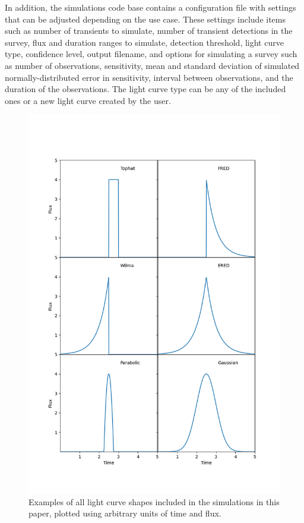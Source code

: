 \documentclass[12pt]{article}
\begin{document}
In addition, the simulations code base contains a configuration file with settings that can be adjusted depending on the use case. These settings include items such as number of transients to simulate, number of transient detections in the survey, flux and duration ranges to simulate, detection threshold, light curve type, confidence level, output filename, and options for simulating a survey such as number of observations, sensitivity, mean and standard deviation of simulated normally-distributed error in sensitivity, interval between observations, and the duration of the observations. The light curve type can be any of the included ones or a new light curve created by the user. 


\begin{figure}
\includegraphics[width=\columnwidth]{multilcexample.png}
\caption{Examples of all light curve shapes included in the simulations in this paper, plotted using arbitrary units of time and flux.}
\label{multilc}
 \end{figure}
\end{document}
